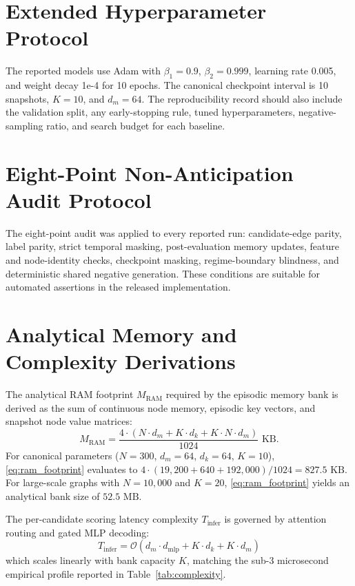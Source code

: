 \documentclass[conference]{IEEEtran}
\begin{document}



\appendices
\section{Extended Hyperparameter Protocol}
The reported models use Adam with $\beta_1=0.9$, $\beta_2=0.999$, learning rate 0.005, and weight decay 1e-4 for 10 epochs. The canonical checkpoint interval is 10 snapshots, $K=10$, and $d_m=64$. The reproducibility record should also include the validation split, any early-stopping rule, tuned hyperparameters, negative-sampling ratio, and search budget for each baseline.

\section{Eight-Point Non-Anticipation Audit Protocol}
The eight-point audit was applied to every reported run: candidate-edge parity, label parity, strict temporal masking, post-evaluation memory updates, feature and node-identity checks, checkpoint masking, regime-boundary blindness, and deterministic shared negative generation. These conditions are suitable for automated assertions in the released implementation.

\section{Analytical Memory and Complexity Derivations}
The analytical RAM footprint $M_{\text{RAM}}$ required by the episodic memory bank is derived as the sum of continuous node memory, episodic key vectors, and snapshot node value matrices:
\begin{equation}
\label{eq:ram_footprint}
M_{\text{RAM}} = \frac{4 \cdot (N \cdot d_m + K \cdot d_k + K \cdot N \cdot d_m)}{1024} \text{ KB}.
\end{equation}
For canonical parameters ($N=300$, $d_m=64$, $d_k=64$, $K=10$), \eqref{eq:ram_footprint} evaluates to $4 \cdot (19{,}200 + 640 + 192{,}000) / 1024 = 827.5\text{ KB}$. For large-scale graphs with $N=10{,}000$ and $K=20$, \eqref{eq:ram_footprint} yields an analytical bank size of $52.5\text{ MB}$.

The per-candidate scoring latency complexity $T_{\text{infer}}$ is governed by attention routing and gated MLP decoding:
\begin{equation}
\label{eq:infer_complexity}
T_{\text{infer}} = \mathcal{O}\left( d_m \cdot d_{\text{mlp}} + K \cdot d_k + K \cdot d_m \right)
\end{equation}
which scales linearly with bank capacity $K$, matching the sub-3 microsecond empirical profile reported in Table~\ref{tab:complexity}.
\end{document}
